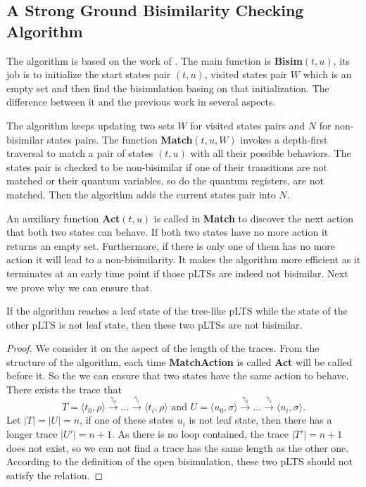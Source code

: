 \documentclass[runningheads]{llncs}
\begin{document}
\subsection{A Strong Ground Bisimilarity Checking Algorithm}
The algorithm is based on the work of \cite{TOCL2014}. The main function is \textbf{Bisim}$(t,u)$, its job is to initialize the start states pair $(t,u)$, visited states pair $W$ which is an empty set and then find the bisimulation basing on that initialization. The difference between it and the previous work in several aspects.

The algorithm keeps updating two sets $W$ for visited states pairs and $N$ for non-bisimilar states pairs. The function \textbf{Match}$(t,u,W)$ invokes a depth-first traversal to match a pair of 
states $(t,u)$ with all their possible behaviors. The states pair is checked to be non-bisimilar if one of their transitions are not matched or their quantum variables, so do the quantum registers, are not matched. Then the algorithm adds the current states pair into $N$. 

An auxiliary function \textbf{Act}$(t,u)$ is called in \textbf{Match} to discover the next action that both two states can behave. If both two states have no more action it returns an empty set. Furthermore, if there is only one of them has no more action it will lead to a non-bisimilarity. It makes the algorithm more efficient as it terminates at an early time point if those pLTSs are indeed not bisimilar. Next we prove why we can ensure that.
\begin{theorem}
If the algorithm reaches a leaf state of the tree-like pLTS while the state of the other pLTS is not leaf state, then these two pLTSs are not bisimilar.
\end{theorem}
\begin{proof}
We consider it on the aspect of the length of the traces. From the structure of the algorithm, each time \textbf{MatchAction} is called \textbf{Act} will be called before it. So the we can ensure that two states have the same action to behave. There exists the trace that
\[T = \langle t_0,\rho\rangle\xrightarrow{\gamma_0}...\xrightarrow{\gamma_i}\langle t_i,\rho\rangle\text{ and }U = \langle u_0,\sigma\rangle\xrightarrow{\gamma_0}...\xrightarrow{\gamma_i}\langle u_i,\sigma\rangle.\]
Let $|T|=|U|=n$, if one of these states $u_i$ is not leaf state, then there has a longer trace $|U'|=n+1$. As there is no loop contained, the trace $|T'|=n+1$ does not exist, so we can not find a trace has the same length as the other one. According to the definition of the open bisimulation, these two pLTS should not satisfy the relation.
\end{proof}
\end{document}
